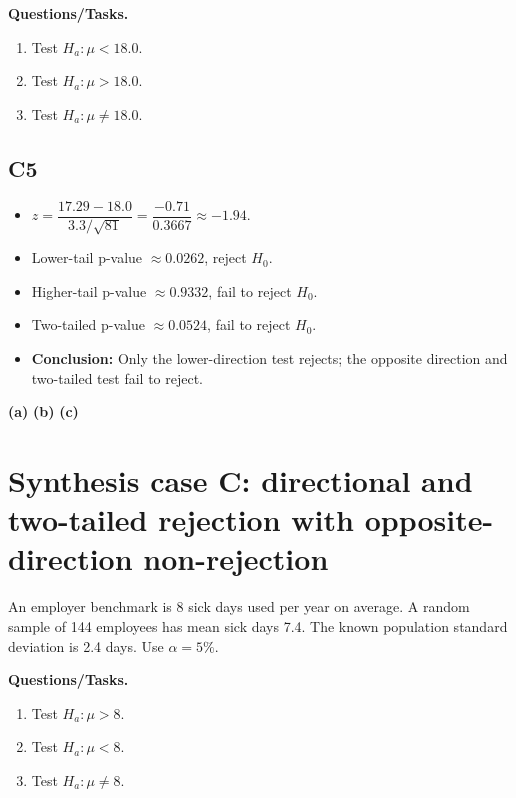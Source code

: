 \textbf{Questions/Tasks.}
\begin{enumerate}
    \item[(a)] Test \(H_a\colon \mu<18.0\).
    \item[(b)] Test \(H_a\colon \mu>18.0\).
    \item[(c)] Test \(H_a\colon \mu\ne18.0\).
\end{enumerate}

\subsection*{C5}
\begin{itemize}
    \item \(z=\dfrac{17.29-18.0}{3.3/\sqrt{81}}=\dfrac{-0.71}{0.3667}\approx-1.94\).
    \item Lower-tail p-value \(\approx0.0262\), reject \(H_0\).
    \item Higher-tail p-value \(\approx0.9332\), fail to reject \(H_0\).
    \item Two-tailed p-value \(\approx0.0524\), fail to reject \(H_0\).
    \item \textbf{Conclusion:} Only the lower-direction test rejects; the opposite direction and two-tailed test fail to reject.
\end{itemize}

\begin{center}
\textbf{(a)}\;
\hspace{0.5cm}
\textbf{(b)}\;
\hspace{0.5cm}
\textbf{(c)}\;
\end{center}

\section{Synthesis case C: directional and two-tailed rejection with opposite-direction non-rejection}
An employer benchmark is 8 sick days used per year on average. A random sample of 144 employees has mean sick days 7.4. The known population standard deviation is 2.4 days. Use \(\alpha=5\%\).

\textbf{Questions/Tasks.}
\begin{enumerate}
    \item[(a)] Test \(H_a\colon \mu>8\).
    \item[(b)] Test \(H_a\colon \mu<8\).
    \item[(c)] Test \(H_a\colon \mu\ne8\).
\end{enumerate}

